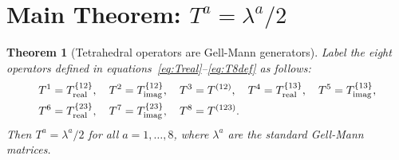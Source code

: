 \documentclass[11pt,a4paper]{article}
\newtheorem{theorem}{Theorem}[section]
\begin{document}
\section{Main Theorem: \texorpdfstring{$T^a = \lambda^a/2$}{Ta = lambda-a/2}}

\begin{theorem}[Tetrahedral operators are Gell-Mann generators]
\label{thm:Tequal}
Label the eight operators defined in equations~\eqref{eq:Treal}--\eqref{eq:T8def}
as follows:
\begin{align*}
T^1 &= T^{\{12\}}_{\rm real},\quad
T^2 = T^{\{12\}}_{\rm imag},\quad
T^3 = T^{(12)},\quad
T^4 = T^{\{13\}}_{\rm real},\quad
T^5 = T^{\{13\}}_{\rm imag}, \\
T^6 &= T^{\{23\}}_{\rm real},\quad
T^7 = T^{\{23\}}_{\rm imag},\quad
T^8 = T^{(123)}.
\end{align*}
Then $T^a = \lambda^a/2$ for all $a = 1,\ldots,8$, where
$\lambda^a$ are the standard Gell-Mann matrices.
\end{theorem}
\end{document}
